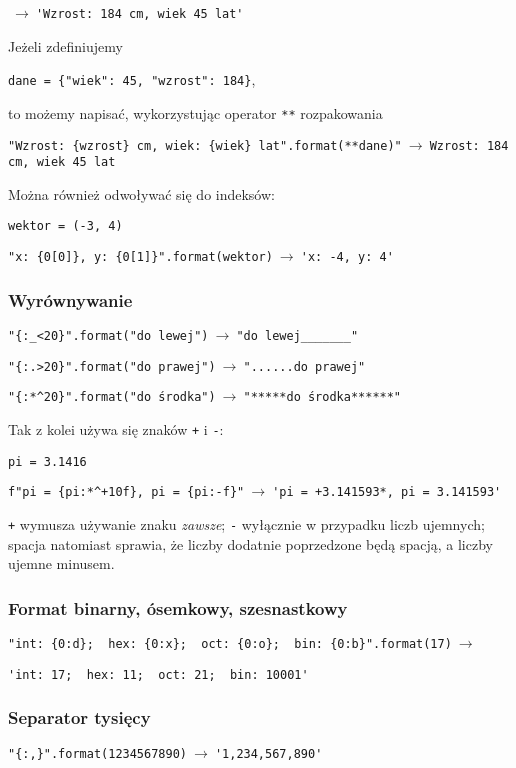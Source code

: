$\ \to\ $\verb|'Wzrost: 184 cm, wiek 45 lat'|

Jeżeli zdefiniujemy

\verb|dane = {"wiek": 45, "wzrost": 184}|,

to możemy napisać, wykorzystując operator \verb|**| rozpakowania

\verb|"Wzrost: {wzrost} cm, wiek: {wiek} lat".format(**dane)"|$\ \to\ $\verb|Wzrost: 184 cm, wiek 45 lat|

Można również odwoływać się do indeksów:

\verb|wektor = (-3, 4)|

\verb|"x: {0[0]}, y: {0[1]}".format(wektor)|$\ \to\ $\verb|'x: -4, y: 4'|

\subsubsection*{Wyrównywanie}

\verb|"{:_<20}".format("do lewej")|$\ \to\ $\verb|"do lewej_______"|

\verb|"{:.>20}".format("do prawej")|$\ \to\ $\verb|"......do prawej"|

\verb|"{:*^20}".format("do środka")|$\ \to\ $\verb|"*****do środka******"|

Tak z kolei używa się znaków \verb|+| i \verb|-|:

\verb|pi = 3.1416|

\verb|f"pi = {pi:*^+10f}, pi = {pi:-f}"|$\ \to\ $\verb|'pi = +3.141593*, pi = 3.141593'|

\verb|+| wymusza używanie znaku \emph{zawsze}; \verb|-| wyłącznie w przypadku liczb ujemnych; spacja natomiast sprawia, że liczby dodatnie poprzedzone będą spacją, a liczby ujemne minusem.

\subsubsection*{Format binarny, ósemkowy, szesnastkowy}

\verb|"int: {0:d};  hex: {0:x};  oct: {0:o};  bin: {0:b}".format(17)|$\ \to\ $

\verb|'int: 17;  hex: 11;  oct: 21;  bin: 10001'|

\subsubsection*{Separator tysięcy}

\verb|"{:,}".format(1234567890)|$\ \to\ $\verb|'1,234,567,890'|

